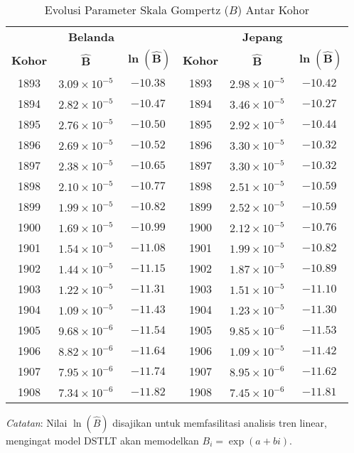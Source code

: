 \begin{table}[htbp]
\centering
\caption{Evolusi Parameter Skala Gompertz ($B$) Antar Kohor}
\label{tab:parameter_trends_full}
\small
\begin{tabular}{ccc|ccc}
\hline
\multicolumn{3}{c|}{\textbf{Belanda}} & \multicolumn{3}{c}{\textbf{Jepang}} \\
\textbf{Kohor} & $\boldsymbol{\hat{B}}$ & $\boldsymbol{\ln(\hat{B})}$ & \textbf{Kohor} & $\boldsymbol{\hat{B}}$ & $\boldsymbol{\ln(\hat{B})}$ \\
\hline
1893 & $3.09 \times 10^{-5}$ & $-10.38$ & 1893 & $2.98 \times 10^{-5}$ & $-10.42$ \\
1894 & $2.82 \times 10^{-5}$ & $-10.47$ & 1894 & $3.46 \times 10^{-5}$ & $-10.27$ \\
1895 & $2.76 \times 10^{-5}$ & $-10.50$ & 1895 & $2.92 \times 10^{-5}$ & $-10.44$ \\
1896 & $2.69 \times 10^{-5}$ & $-10.52$ & 1896 & $3.30 \times 10^{-5}$ & $-10.32$ \\
1897 & $2.38 \times 10^{-5}$ & $-10.65$ & 1897 & $3.30 \times 10^{-5}$ & $-10.32$ \\
1898 & $2.10 \times 10^{-5}$ & $-10.77$ & 1898 & $2.51 \times 10^{-5}$ & $-10.59$ \\
1899 & $1.99 \times 10^{-5}$ & $-10.82$ & 1899 & $2.52 \times 10^{-5}$ & $-10.59$ \\
1900 & $1.69 \times 10^{-5}$ & $-10.99$ & 1900 & $2.12 \times 10^{-5}$ & $-10.76$ \\
1901 & $1.54 \times 10^{-5}$ & $-11.08$ & 1901 & $1.99 \times 10^{-5}$ & $-10.82$ \\
1902 & $1.44 \times 10^{-5}$ & $-11.15$ & 1902 & $1.87 \times 10^{-5}$ & $-10.89$ \\
1903 & $1.22 \times 10^{-5}$ & $-11.31$ & 1903 & $1.51 \times 10^{-5}$ & $-11.10$ \\
1904 & $1.09 \times 10^{-5}$ & $-11.43$ & 1904 & $1.23 \times 10^{-5}$ & $-11.30$ \\
1905 & $9.68 \times 10^{-6}$ & $-11.54$ & 1905 & $9.85 \times 10^{-6}$ & $-11.53$ \\
1906 & $8.82 \times 10^{-6}$ & $-11.64$ & 1906 & $1.09 \times 10^{-5}$ & $-11.42$ \\
1907 & $7.95 \times 10^{-6}$ & $-11.74$ & 1907 & $8.95 \times 10^{-6}$ & $-11.62$ \\
1908 & $7.34 \times 10^{-6}$ & $-11.82$ & 1908 & $7.45 \times 10^{-6}$ & $-11.81$ \\
\hline
\end{tabular}
\begin{tablenotes}
\small
\item \textit{Catatan}: Nilai $\ln(\hat{B})$ disajikan untuk memfasilitasi analisis tren linear, mengingat model DSTLT akan memodelkan $B_i = \exp(a + bi)$.
\end{tablenotes}
\end{table}

